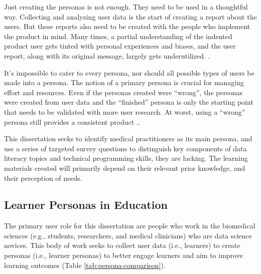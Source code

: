 \documentclass[010-intro.tex]{subfiles}
\begin{document}
        Just creating the personas is not enough.
        They need to be used in a thoughtful way.
        Collecting and analyzing user data is the start of creating a report about the users.
        But these reports also need to be created with the people who implement the product in mind.
        Many times, a partial understanding of the indented product user gets
        tinted with personal experiences and biases,
        and the user report, along with its original message, largely gets underutilized.
        \cite{pruittPersonaLifecycleKeeping2006}.
    
        It's impossible to cater to every persona,
        nor should all possible types of users be made into a persona.
        The notion of a primary persona is crucial for managing effort and resources.
        Even if the personas created were ``wrong'',
        the personas were created from user data and the ``finished'' persona is only the starting point
        that needs to be validated with more user research.
        At worst, using a ``wrong'' persona still provides a consistent product
        \cite{pruittPersonaLifecycleKeeping2006}..
    
        This dissertation seeks to identify medical practitioners as its main persona,
        and use a series of targeted survey questions to distinguish key components
        of data literacy topics and technical programming skills, they are lacking.
        The learning materials created will primarily depend on their relevant prior knowledge,
        and their perception of needs.

\subsection{Learner Personas in Education}
\label{sse:intro-learner-personas}

    The primary user role for this dissertation are people who work in the biomedical sciences
    (e.g., students, researchers, and medical clinicians)
    who are data science novices.
    This body of work seeks to collect user data (i.e., learners) to create personas (i.e., learner personas)
    to better engage learners and aim to improve learning outcomes (Table \ref{tab:persona-comparison}).
\end{document}

